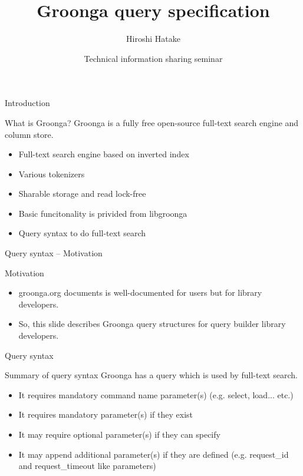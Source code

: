 \documentclass[12pt, unicode]{beamer}
\title{Groonga query specification}
\author{Hiroshi Hatake}
\date[2016/03/12]{Technical information sharing seminar}
\begin{document}
\frame{\maketitle}

\begin{frame}{Introduction}
\begin{block}{What is Groonga?}
Groonga is a fully free open-source full-text search engine and column store.
\end{block}
\begin{itemize}
\item<2-> Full-text search engine based on inverted index
\item<3-> Various tokenizers
\item<4-> Sharable storage and read lock-free
\item<5-> Basic funcitonality is privided from libgroonga
\item<6-> Query syntax to do full-text search
\end{itemize}
\end{frame}

\begin{frame}{Query syntax -- Motivation}
  \begin{block}{Motivation}
  \begin{itemize}
  \item<1-> groonga.org documents is well-documented for users but for library developers.
  \item<2-> So, this slide describes Groonga query structures for query builder library developers.
  \end{itemize}
  \end{block}
\end{frame}

\begin{frame}{Query syntax}
\begin{block}{Summary of query syntax}
Groonga has a query which is used by full-text search.
\end{block}
\begin{itemize}
\item<2-> It requires mandatory command name parameter(s) (e.g. select, load... etc.)
\item<3-> It requires mandatory parameter(s) if they exist
\item<4-> It may require optional parameter(s) if they can specify
\item<5-> It may append additional parameter(s) if they are defined (e.g. request\_id and request\_timeout like parameters)
\end{itemize}
\end{frame}
\end{document}
